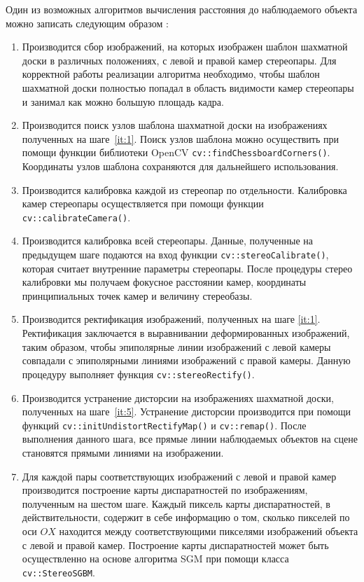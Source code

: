 \documentclass[oneside,final,12pt]{scrartcl}
\begin{document}
			Один из возможных алгоритмов вычисления расстояния до наблюдаемого объекта можно записать следующим образом \cite{Ilyasov2016}:

			\begin{enumerate}
				\item Производится сбор изображений, на которых изображен шаблон шахматной доски в различных положениях, с левой и правой камер стереопары. Для корректной работы реализации алгоритма необходимо, чтобы шаблон шахматной доски полностью попадал в область видимости камер стереопары и занимал как можно большую площадь кадра. \label{it:1}

				\item Производится поиск узлов шаблона шахматной доски на изображениях полученных на шаге~\ref{it:1}. Поиск узлов шаблона можно осуществить при помощи функции библиотеки OpenCV \texttt{cv::findChessboardCorners()}. Координаты узлов шаблона сохраняются для дальнейшего использования. \label{it:2}

				\item Производится калибровка каждой из стереопар по отдельности. Калибровка камер стереопары осуществляется при помощи функции \texttt{cv::calibrateCamera()}. \label{it:3}

				\item Производится калибровка всей стереопары. Данные, полученные на предыдущем шаге подаются на вход функции \texttt{cv::stereoCalibrate()}, которая считает внутренние параметры стереопары. После процедуры стерео калибровки мы получаем фокусное расстоянии камер, координаты принципиальных точек камер и величину стереобазы. \label{it:4}

				\item Производится ректификация изображений, полученных на шаге \ref{it:1}. Ректификация заключается в выравнивании деформированных изображений, таким образом, чтобы эпиполярные линии изображений с левой камеры совпадали с эпиполярными линиями изображений с правой камеры. Данную процедуру выполняет функция \texttt{cv::stereoRectify()}. \label{it:5}

				\item Производится устранение дисторсии на изображениях шахматной доски, полученных на шаге~\ref{it:5}. Устранение дисторсии производится при помощи функций \texttt{cv::initUndistortRectifyMap()} и \texttt{cv::remap()}. После выполнения данного шага, все прямые линии наблюдаемых объектов на сцене становятся прямыми линиями на изображении. \label{it:6}

				\item Для каждой пары соответствующих изображений с левой и правой камер производится построение карты диспаратностей по изображениям, полученным на шестом шаге. Каждый пиксель карты диспаратностей, в действительности, содержит в себе информацию о том, сколько пикселей по оси \(OX\) находится между соответствующими пикселями изображений объекта с левой и правой камер. Построение карты диспаратностей может быть осуществленно на основе алгоритма SGM \cite{Hirschmuller2008} при помощи класса \texttt{cv::StereoSGBM}. \label{it:7}


\end{enumerate}
\end{document}
